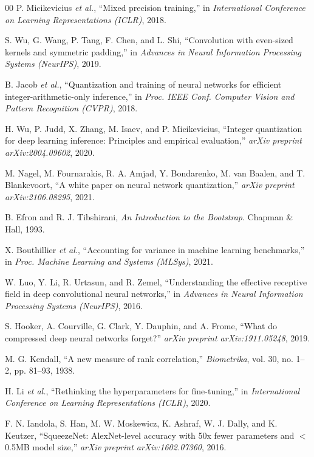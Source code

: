 \documentclass[conference]{IEEEtran}
\begin{document}
\begin{thebibliography}{00}
P. Micikevicius \textit{et al.}, ``Mixed precision training,'' in \textit{International Conference on Learning Representations (ICLR)}, 2018.

S. Wu, G. Wang, P. Tang, F. Chen, and L. Shi, ``Convolution with even-sized kernels and symmetric padding,'' in \textit{Advances in Neural Information Processing Systems (NeurIPS)}, 2019.

B. Jacob \textit{et al.}, ``Quantization and training of neural networks for efficient integer-arithmetic-only inference,'' in \textit{Proc. IEEE Conf. Computer Vision and Pattern Recognition (CVPR)}, 2018.

H. Wu, P. Judd, X. Zhang, M. Isaev, and P. Micikevicius, ``Integer quantization for deep learning inference: Principles and empirical evaluation,'' \textit{arXiv preprint arXiv:2004.09602}, 2020.

M. Nagel, M. Fournarakis, R. A. Amjad, Y. Bondarenko, M. van Baalen, and T. Blankevoort, ``A white paper on neural network quantization,'' \textit{arXiv preprint arXiv:2106.08295}, 2021.

B. Efron and R. J. Tibshirani, \textit{An Introduction to the Bootstrap}. Chapman \& Hall, 1993.

X. Bouthillier \textit{et al.}, ``Accounting for variance in machine learning benchmarks,'' in \textit{Proc. Machine Learning and Systems (MLSys)}, 2021.

W. Luo, Y. Li, R. Urtasun, and R. Zemel, ``Understanding the effective receptive field in deep convolutional neural networks,'' in \textit{Advances in Neural Information Processing Systems (NeurIPS)}, 2016.

S. Hooker, A. Courville, G. Clark, Y. Dauphin, and A. Frome, ``What do compressed deep neural networks forget?'' \textit{arXiv preprint arXiv:1911.05248}, 2019.

M. G. Kendall, ``A new measure of rank correlation,'' \textit{Biometrika}, vol. 30, no. 1--2, pp. 81--93, 1938.

H. Li \textit{et al.}, ``Rethinking the hyperparameters for fine-tuning,'' in \textit{International Conference on Learning Representations (ICLR)}, 2020.

F. N. Iandola, S. Han, M. W. Moskewicz, K. Ashraf, W. J. Dally, and K. Keutzer, ``SqueezeNet: AlexNet-level accuracy with 50x fewer parameters and $<$0.5MB model size,'' \textit{arXiv preprint arXiv:1602.07360}, 2016.

\end{thebibliography}
\end{document}
